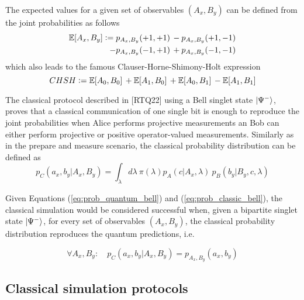The expected values for a given set of observables $(A_{x}, B_{y})$ can be defined from the joint probabilities as follows
\begin{equation}\label{eq:bell_expected_values}
\begin{split}
\mathbb{E}[A_{x}, B_{y}] \vcentcolon= p_{A_x,B_y}(+1, +1)\,- p_{A_x,B_y}(+1, -1)\\-p_{A_x,B_y}(-1, +1)\,+ p_{A_x,B_y}(-1, -1)
\end{split}
\end{equation}
which also leads to the famous Clauser-Horne-Shimony-Holt expression
\begin{equation}\label{eq:bell_inequality}
CHSH \vcentcolon= \mathbb{E}[A_{0},B_{0}]\,+\mathbb{E}[A_{1},B_{0}]\,+\mathbb{E}[A_{0},B_{1}]\,-\mathbb{E}[A_{1},B_{1}]
\end{equation}

The classical protocol described in [RTQ22] using a Bell singlet state $\ket{\Psi^{-}}$, proves that a classical communication of one single bit is enough to reproduce the joint probabilities when Alice performs projective measurements an Bob can either perform projective or positive operator-valued measurements. Similarly as in the prepare and measure scenario, the classical probability distribution can be defined as
\begin{equation}\label{eq:prob_classic_bell}
p_C(a_{x}, b_{y}|A_{x},B_{y}) = \int_{\lambda} d\lambda\ \pi(\lambda) p_A(c|A_{x}, \lambda)\ p_B(b_{y}|B_{y}, c, \lambda)
\end{equation}

Given Equations (\ref{eq:prob_quantum_bell}) and (\ref{eq:prob_classic_bell}), the classical simulation would be considered successful when, given a bipartite singlet state $\ket{\Psi^{-}}$, for every set of observables $(A_{x}, B_{y})$, the classical probability distribution reproduces the quantum predictions, i.e.

\begin{equation}\label{eq:prob_classic_quantum_bell}
\forall A_{x}, B_{y}:\quad p_C(a_{x}, b_{y}|A_{x},B_{y}) = p_{A_x,B_y}(a_x, b_y)
\end{equation}

\subsection{Classical simulation protocols}\label{section:protocols}
